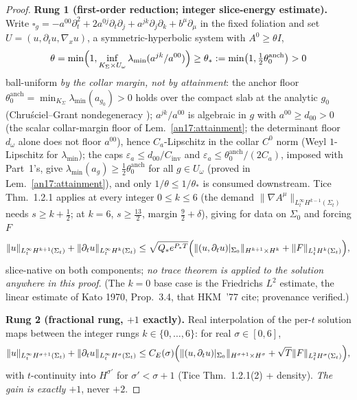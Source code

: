 \begin{proof}
\medskip\noindent
\textbf{Rung 1 (first-order reduction; integer slice-energy estimate).} Write
$\square_g=-a^{00}\partial_t^2+2a^{0j}\partial_t\partial_j
+a^{jk}\partial_j\partial_k+b^\mu\partial_\mu$ in the fixed foliation and set
$U=(u,\partial_t u,\nabla_x u)$, a symmetric-hyperbolic system with
$A^0\ge\theta I$,
\[
 \theta=\min\Bigl(1,\inf_{K_\Sigma\times U_\omega}
 \lambda_{\min}(a^{jk}/a^{00})\Bigr)\ge\theta_*
 :=\min\bigl(1,\tfrac12\theta_0^{\mathrm{anch}}\bigr)>0
\]
ball-uniform \emph{by the collar margin, not by attainment}: the anchor floor
$\theta_0^{\mathrm{anch}}=\min_{K_\Sigma}\lambda_{\min}(a_{g_0})>0$ holds over
the compact slab at the analytic $g_0$ (Chru\'sciel--Grant nondegeneracy
\cite{ChruscielGrant2012}); $a^{jk}/a^{00}$ is algebraic in $g$ with
$a^{00}\ge d_{00}>0$ (the scalar collar-margin floor of
Lem.~\ref{an17:attainment}; the determinant floor $d_\omega$ alone does
not floor $a^{00}$), hence $C_a$-Lipschitz in the collar $C^0$ norm (Weyl
$1$-Lipschitz for $\lambda_{\min}$); the caps
$\varepsilon_a\le d_{00}/C_{\mathrm{inv}}$ and
$\varepsilon_a\le\theta_0^{\mathrm{anch}}/(2C_a)$, imposed with Part~1's,
give $\lambda_{\min}(a_g)\ge\tfrac12\theta_0^{\mathrm{anch}}$ for all
$g\in U_\omega$ (proved in Lem.~\ref{an17:attainment}),
and only $1/\theta\le1/\theta_*$ is consumed downstream. Tice
Thm.~1.2.1 \cite{Tice2018} applies at every integer $0\le k\le6$ (the demand
$\|\nabla A^\mu\|_{L^\infty_t H^{k-1}(\Sigma_t)}$ needs $s\ge k+\tfrac12$; at
$k=6$, $s\ge\tfrac{13}2$, margin $\tfrac92+\delta$), giving for data on
$\Sigma_0$ and forcing $F$
\begin{equation}\label{an17:eq-slice-tice}
 \|u\|_{L^\infty_t H^{k+1}(\Sigma_t)}+\|\partial_tu\|_{L^\infty_t H^{k}(\Sigma_t)}
 \le\sqrt{Q_*e^{P_*T}}\Bigl(\|(u,\partial_tu)|_{\Sigma_0}\|_{H^{k+1}\times H^k}
 +\|F\|_{L^1_t H^k(\Sigma_t)}\Bigr),
\end{equation}
slice-native on both components; \emph{no trace theorem is applied to the
solution anywhere in this proof}. (The $k=0$ base case is the Friedrichs $L^2$
estimate, the linear estimate of Kato 1970, Prop.~3.4, that HKM~'77 cite;
provenance verified.)

\medskip\noindent
\textbf{Rung 2 (fractional rung, $+1$ exactly).} Real interpolation of the
per-$t$ solution maps between the integer rungs $k\in\{0,\dots,6\}$: for real
$\sigma\in[0,6]$,
\begin{equation}\label{an17:eq-slice-frac}
 \|u\|_{L^\infty_t H^{\sigma+1}(\Sigma_t)}
 +\|\partial_tu\|_{L^\infty_t H^{\sigma}(\Sigma_t)}
 \le C_E(\sigma)\Bigl(\|(u,\partial_tu)|_{\Sigma_0}\|_{H^{\sigma+1}\times
 H^{\sigma}}+\sqrt T\|F\|_{L^2_t H^{\sigma}(\Sigma_t)}\Bigr),
\end{equation}
with $t$-continuity into $H^{\sigma'}$ for $\sigma'<\sigma+1$ (Tice
Thm.~1.2.1(2) + density). \emph{The gain is exactly $+1$}, never $+2$.


\end{proof}
